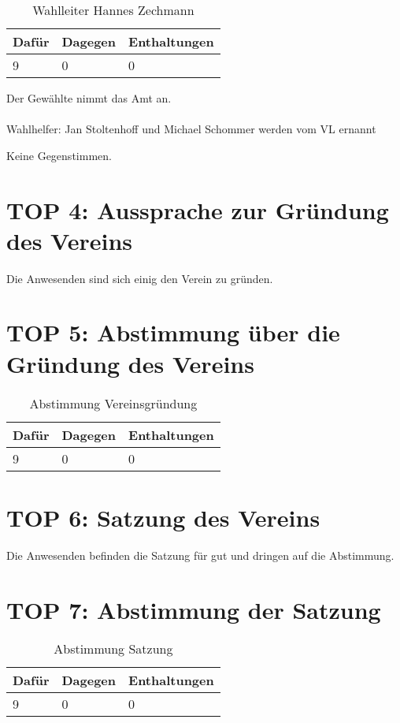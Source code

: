\documentclass[a4paper]{scrartcl}
\begin{document}
\begin{table}[h]
\begin{tabularx}{\textwidth}{XXX}
Dafür & Dagegen & Enthaltungen\\
\toprule
9 & 0 & 0\\
\end{tabularx}
\caption{Wahlleiter Hannes Zechmann}
\end{table}
Der Gewählte nimmt das Amt an.\\
\\
Wahlhelfer: Jan Stoltenhoff und Michael Schommer werden vom VL ernannt

Keine Gegenstimmen.

\clearpage

\section{TOP 4: Aussprache zur Gründung des Vereins}
Die Anwesenden sind sich einig den Verein zu gründen.

\section{TOP 5: Abstimmung über die Gründung des Vereins}

\begin{table}[h]
\begin{tabularx}{\textwidth}{XXX}
Dafür & Dagegen & Enthaltungen\\
\toprule
9 & 0 & 0\\
\end{tabularx}
\caption{Abstimmung Vereinsgründung}
\end{table}

\clearpage

\section{TOP 6: Satzung des Vereins}
Die Anwesenden befinden die Satzung für gut und dringen auf die Abstimmung.
\section{TOP 7: Abstimmung der Satzung}
\begin{table}[h]
\begin{tabularx}{\textwidth}{XXX}
Dafür & Dagegen & Enthaltungen\\
\toprule
9 & 0 & 0\\
\end{tabularx}
\caption{Abstimmung Satzung}
\end{table}
\end{document}
